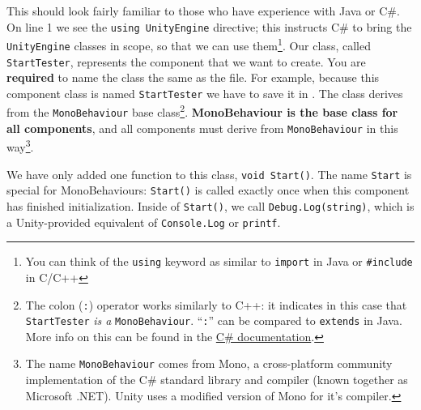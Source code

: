 \documentclass[11pt]{article}
\begin{document}
This should look fairly familiar to those who have experience with Java or C\#.  On line 1 we see the
\lstinline|using UnityEngine| directive; this instructs C\# to bring the \lstinline|UnityEngine|
classes in scope, so that we can use them\footnote{You can think of the
\lstinline|using| keyword as similar to \lstinline|import| in Java or \lstinline|#include| in C/C++}.
Our class, called \lstinline|StartTester|, represents the component that we want to create.  You are
\textbf{required} to name the class the same as the file.  For example, because this component class
is named \lstinline|StartTester| we have to save it in .  The class derives
from the \lstinline|MonoBehaviour| base class\footnote{The colon (\lstinline|:|) operator works 
similarly to C++: it indicates in this case that \lstinline|StartTester| \textit{is a} 
\lstinline|MonoBehaviour|.  ``\lstinline|:|'' can be compared to \lstinline|extends| in Java.  More
info on this can be found in the 
\href{https://docs.microsoft.com/en-us/dotnet/csharp/programming-guide/classes-and-structs/polymorphism}{C\# documentation}.}.
\textbf{MonoBehaviour is the base class for all components}, and all components must derive from
\lstinline|MonoBehaviour| in this way\footnote{The name \lstinline|MonoBehaviour| comes from Mono,
a cross-platform community implementation of the C\# standard library and compiler (known together as 
Microsoft .NET).  Unity uses a modified version of Mono for it's compiler.}.

We have only added one function to this class, \lstinline|void Start()|.  The name \lstinline|Start|
is special for MonoBehaviours: \lstinline|Start()| is called exactly once when this component has
finished initialization.  Inside of \lstinline|Start()|, we call \lstinline|Debug.Log(string)|,
which is a Unity-provided equivalent of \lstinline|Console.Log| or \lstinline|printf|.
\end{document}
